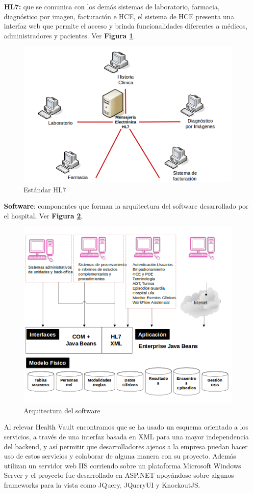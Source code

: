 \textbf{HL7:}
 que se comunica con los demás sistemas de laboratorio, farmacia, diagnóstico por imagen, facturación e HCE, el sistema de HCE presenta una interfaz web que permite el acceso y brinda funcionalidades diferentes a médicos, administradores y pacientes. Ver \textbf{Figura \ref{esthl7}}.
\begin{figure}
  \centering
  \includegraphics[width=.8\textwidth]{img/tp1/hl7}
  \caption{Estándar HL7}
  \label{esthl7}
\end{figure}

	\textbf{Software}: componentes que forman la arquitectura del software desarrollado por el hospital. Ver \textbf{Figura \ref{arqsw}}.
\begin{figure}
  \centering
  \includegraphics[width=.8\textwidth]{img/tp1/modgenfinal}
  \caption{Arquitectura del software}
  \label{arqsw}
\end{figure}

Al relevar Health Vault encontramos que se ha usado un esquema orientado a los servicios, a través de una interfaz basada en XML para una mayor independencia del backend, y así permitir que desarrolladores ajenos a la empresa puedan hacer uso de estos servicios y colaborar de alguna manera con su proyecto. Además utilizan un servidor web IIS corriendo sobre un plataforma Microsoft Windows Server y el proyecto fue desarrollado en ASP.NET apoyándose sobre algunos frameworks para la vista como JQuery, JQueryUI y KnockoutJS.

